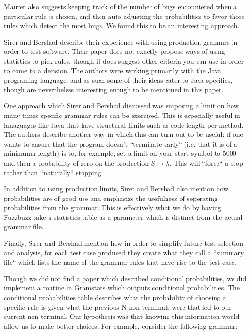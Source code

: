 Maurer also suggests keeping track of the number of bugs encountered when a
particular rule is chosen, and then auto adjusting the probabilities to favor
those rules which detect the most bugs. We found this to be an interesting
approach.

Sirer and Bershad\cite{Bershad1999} describe their experience with using
production grammrs in order to test software. Their paper does not exactly
propose ways of using statistics to pick rules, though it does suggest other
criteria you can use in order to come to a decision. The authors were working
primarily with the Java programing language, and as such some of their ideas
cater to Java specifics, though are nevertheless interesting enough to be
mentioned in this paper.

One approach which Sirer and Bershad discussed was emposing a limit on how many
times specific grammar rules can be exercised. This is especially useful in
lanaguages like Java that have structural limits such as code length per
method. The authors describe another way in which this can turn out to be
useful: if one wants to ensure that the program doesn't ``terminate early``
(i.e. that it is of a minimunm length) is to, for example, set a limit on your
start symbol to 5000 and then a probability of zero on the production $S
\rightarrow \lambda$. This will ``force`` a stop rather than ``naturally``
stopping.

In addition to using production limits, Sirer and Bershad also mention how
probabilities are of good use and emphasize the usefulness of seperating
probabilities from the grammar. This is effectively what we do by having
Fuzzbuzz take a statistics table as a parameter which is distinct from the
actual grammar file.

Finally, Sirer and Bershad mention how in order to simplify future test
selection and analysis, for each test case produced they create what they call
a ``summary file`` which lists the name of the grammar rules that have rise to
the test case.

Though we did not find a paper which described conditional probabilities, we
did implement a routine in Gramstats which outputs conditional probabilities.
The conditional probabilities table describes what the probability of choosing a
specific rule is given what the previous N non-terminals were that led to our
current non-terminal. Our hypothesis was that knowing this information would
allow us to make better choices. For example, consider the following grammar:

